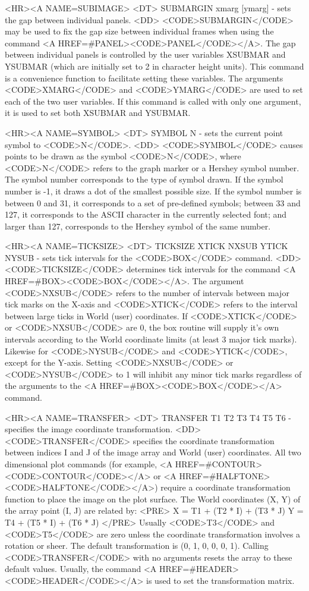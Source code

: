 \begin{rawhtml}
<HR><A NAME=SUBIMAGE>
<DT>
SUBMARGIN xmarg [ymarg] - sets the gap between individual panels.
<DD>
	<CODE>SUBMARGIN</CODE> may be used to fix the gap size between
	individual frames when using the command
	<A HREF=#PANEL><CODE>PANEL</CODE></A>.  The gap between
	individual panels is controlled by the user variables
	XSUBMAR and YSUBMAR (which are initially set to 2 in character
	height units).  This command is a convenience function to
	facilitate setting these variables.  The arguments <CODE>XMARG</CODE>
	and <CODE>YMARG</CODE> are used to set each of the two user variables.
	If this command is called with only one argument, it is used to
	set both XSUBMAR and YSUBMAR.

<HR><A NAME=SYMBOL>
<DT>
SYMBOL N - sets the current point symbol to <CODE>N</CODE>.
<DD>
	<CODE>SYMBOL</CODE> causes points to be drawn as the symbol
	<CODE>N</CODE>, where <CODE>N</CODE> refers to the graph marker
	or a Hershey symbol number.  The symbol number corresponds to
	the type of symbol drawn.  If the symbol number is -1, it
	draws a dot of the smallest possible size.  If the symbol number
	is between 0 and 31, it corresponds to a set of pre-defined symbols;
	between 33 and 127, it corresponds to the ASCII character in the
	currently selected font; and larger than 127, corresponds to the
	Hershey symbol of the same number.

<HR><A NAME=TICKSIZE>
<DT>
TICKSIZE XTICK NXSUB YTICK NYSUB - sets tick intervals for the <CODE>BOX</CODE> command.
<DD>
	<CODE>TICKSIZE</CODE> determines tick intervals for the command
	<A HREF=#BOX><CODE>BOX</CODE></A>.  The argument <CODE>NXSUB</CODE>
	refers to the number of intervals between major tick marks on
	the X-axis and <CODE>XTICK</CODE> refers to the interval between
	large ticks in World (user) coordinates.  If <CODE>XTICK</CODE>
	or <CODE>NXSUB</CODE> are 0, the box routine will supply it's
	own intervals according to the World coordinate limits (at
	least 3 major tick marks).  Likewise for <CODE>NYSUB</CODE> and
	<CODE>YTICK</CODE>, except for the Y-axis.  Setting
	<CODE>NXSUB</CODE> or <CODE>NYSUB</CODE> to 1 will inhibit any
	minor tick marks regardless of the arguments to the
	<A HREF=#BOX><CODE>BOX</CODE></A> command.

<HR><A NAME=TRANSFER>
<DT>
TRANSFER T1 T2 T3 T4 T5 T6 - specifies the image coordinate transformation.
<DD>
	<CODE>TRANSFER</CODE> specifies the coordinate transformation
	between indices I and J of the image array and World (user)
	coordinates.  All two dimensional plot commands (for example,
	<A HREF=#CONTOUR><CODE>CONTOUR</CODE></A> or
	<A HREF=#HALFTONE><CODE>HALFTONE</CODE></A>) require a
	coordinate transformation function to place the image on the
	plot surface.  The World coordinates (X, Y) of the array point
	(I, J) are related by:
	<PRE>
    X = T1 + (T2 * I) + (T3 * J)
    Y = T4 + (T5 * I) + (T6 * J)
	</PRE>
	Usually <CODE>T3</CODE> and <CODE>T5</CODE> are zero unless
	the coordinate transformation involves a rotation or sheer.
	The default transformation is (0, 1, 0, 0, 0, 1).  Calling
	<CODE>TRANSFER</CODE> with no arguments resets the array to
	these default values.  Usually, the command
	<A HREF=#HEADER><CODE>HEADER</CODE></A> is used to set the
	transformation matrix.


\end{rawhtml}
